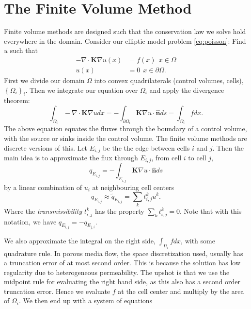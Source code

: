 \documentclass[../Main/main.tex]{subfiles}
\begin{document}
	\section{The Finite Volume Method}


		Finite volume methods are designed such that the conservation law we solve hold everywhere in the domain. Consider our elliptic model problem \eqref{eq:poisson}:
		Find $u$ such that
		\begin{equation} 
			\begin{split}
				-\nabla \cdot \bm{K} \nabla u(x) &= f(x) \ \  x\in \Omega \\ 
				u(x) &= 0 \ \ x\in \partial \Omega.
			\end{split}
		\end{equation}
		 First we divide our domain $\Omega$ into convex quadrilaterals (control volumes, cells), $\left \{ \Omega_i \right \}_i$. Then we integrate our equation over $\Omega_i$ and apply the divergence theorem:
	\begin{equation}\label{eq:fvm1}
		\int_{\Omega_i} -\nabla \cdot \bm{K} \nabla u dx = -\int_{\partial \Omega_i} \bm{K}\nabla u \cdot \bm{\hat{n}} ds = \int_{\Omega_i}fdx.
	\end{equation}
	The above equation equates the fluxes through the boundary of a control volume, with the source or sinks inside the control volume. The finite volume methods are discrete versions of this. Let $E_{i,j}$ be the the edge between cells $i$ and $j$. Then the main idea is to approximate the flux through $E_{i,j}$, from cell $i$ to cell $j$,
	\begin{equation}
		q_{E_{i,j}} =-\int_{E_{i,j}} \bm{K}\nabla u \cdot \bm{\hat{n}} ds
	\end{equation}
	by a linear combination of $u_i$ at neighbouring cell centers
	\begin{equation}
		q_{E_{i,j}}\approx \tilde{q}_{E_{i,j}} = \sum_{k}t_{i,j}^k u^k.
	\end{equation}
	Where the \emph{transmissibility} $t_{i,j}^k$ has the property $\sum_k t_{i,j}^k = 0$. Note that with this notation, we have $q_{E_{i,j}} = - q_{E_{j,i}}$.\par
	We also approximate the integral on the right side, $\int_{\Omega_i}fdx$, with some quadrature rule. In porous media flow, the space discretization used, usually has a truncation error of at most second order. This is because the solution has low regularity due to heterogeneous permeability. The upshot is that we use the midpoint rule for evaluating the right hand side, as this also has a second order truncation error. Hence we evaluate $f$ at the cell center and multiply by the area of $\Omega_i$. We then end up with a system of equations
\end{document}
